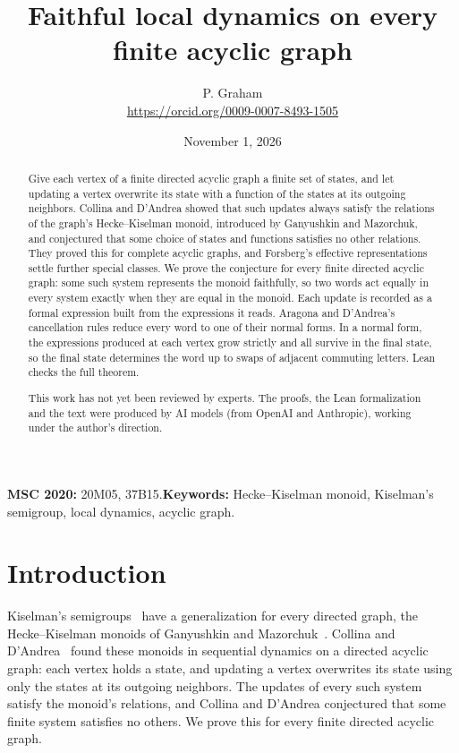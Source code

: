 \documentclass[11pt]{article}
\title{Faithful local dynamics on every finite acyclic graph}
\author{P. Graham\\ \small\url{https://orcid.org/0009-0007-8493-1505}}
\date{November 1, 2026}
\begin{document}
\maketitle
\begin{abstract}
Give each vertex of a finite directed acyclic graph a finite set of states,
and let updating a vertex overwrite its state with a function of the states
at its outgoing neighbors. Collina and D'Andrea showed that such updates
always satisfy the relations of the graph's Hecke--Kiselman monoid, introduced
by Ganyushkin and Mazorchuk, and conjectured that some choice of states and
functions satisfies no other relations. They proved this for complete acyclic
graphs, and Forsberg's effective representations settle further special
classes. We prove the conjecture for every finite directed acyclic
graph: some such system represents the monoid faithfully, so two words act
equally in every system exactly when they are equal in the monoid. Each update
is recorded as a formal expression built from the expressions it reads.
Aragona and D'Andrea's cancellation rules reduce every word to one of their
normal forms. In a normal form, the expressions produced at each vertex grow
strictly and all survive in the final state, so the final state determines
the word up to swaps of adjacent commuting letters. Lean checks the full
theorem.

This work has not yet been reviewed by experts. The proofs, the Lean formalization and the text were produced by AI models (from OpenAI and Anthropic), working under the author's direction.
\end{abstract}
\medskip
\noindent\textbf{MSC 2020:} 20M05, 37B15.\quad\textbf{Keywords:} Hecke--Kiselman monoid, Kiselman's semigroup, local dynamics, acyclic graph.

\section{Introduction}
Kiselman's semigroups~\cite{Kiselman,KM} have a generalization for every
directed graph, the Hecke--Kiselman monoids of Ganyushkin and
Mazorchuk~\cite{GM}. Collina and D'Andrea~\cite{CD} found these monoids in
sequential dynamics on a directed acyclic graph: each vertex holds a state,
and updating a vertex overwrites its state using only the states at its
outgoing neighbors. The updates of every such system satisfy the monoid's
relations, and Collina and D'Andrea conjectured that some finite system
satisfies no others. We prove this for every finite directed acyclic graph.
\end{document}
